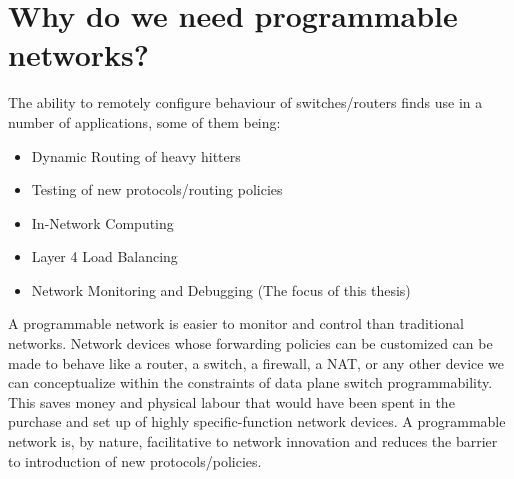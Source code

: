 \section{Why do we need programmable networks?}
The ability to remotely configure behaviour of switches/routers finds use in a number of applications,
some of them being:
\begin{itemize}
  \item Dynamic Routing of heavy hitters
  \item Testing of new protocols/routing policies
  \item In-Network Computing
  \item Layer 4 Load Balancing
  \item Network Monitoring and Debugging (The focus of this thesis)
\end{itemize}
A programmable network is easier to monitor and control than traditional networks. Network devices whose forwarding 
policies can be customized can be made to behave like a router, a switch, a firewall, a NAT, or any other device we can 
conceptualize within the constraints of data plane switch programmability. This saves money and physical labour that would have been
spent in the purchase and set up of highly specific-function network devices. A programmable network is, by nature, facilitative
to network innovation and reduces the barrier to introduction of new protocols/policies.

